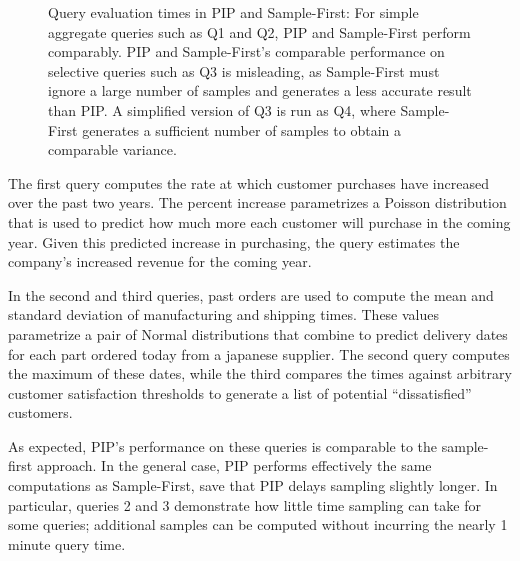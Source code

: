 \begin{figure}
\begin{center}
\caption{Query evaluation times in PIP and Sample-First: For simple aggregate queries such as Q1 and Q2, PIP and Sample-First perform comparably.  PIP and Sample-First's comparable performance on selective queries such as Q3 is misleading, as Sample-First must ignore a large number of samples and generates a less accurate result than PIP.  A simplified version of Q3 is run as Q4, where Sample-First generates a sufficient number of samples to obtain a comparable variance.}
\label{fig:querytimings}
\end{center}
\end{figure}

The first query computes the rate at which customer purchases have increased over the past two years.  The percent increase parametrizes a Poisson distribution that is used to predict how much more each customer will purchase in the coming year.  Given this predicted increase in purchasing, the query estimates the company's increased revenue for the coming year.

In the second and third queries, past orders are used to compute the mean and standard deviation of manufacturing and shipping times.  These values parametrize a pair of Normal distributions that combine to predict delivery dates for each part ordered today from a japanese supplier.  The second query computes the maximum of these dates, while the third compares the times against arbitrary customer satisfaction thresholds to generate a list of potential ``dissatisfied'' customers.

As expected, PIP's performance on these queries is comparable to the sample-first approach.  In the general case, PIP performs effectively the same computations as Sample-First, save that PIP delays sampling slightly longer.  In particular, queries 2 and 3 demonstrate how little time sampling can take for some queries; additional samples can be computed without incurring the nearly 1 minute query time.

